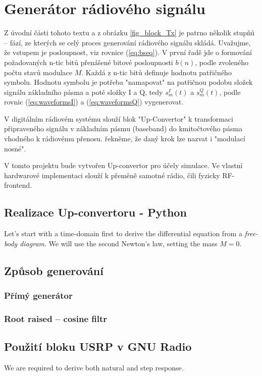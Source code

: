 \section{Generátor rádiového signálu}

Z úvodní části tohoto textu a z obrázku \ref{fig_block_Tx} je patrno několik stupňů -- fází, ze kterých se celý proces generování rádiového signálu skládá. Uvažujme, že vstupem je posloupnost, viz rovnice (\ref{eq:bseq}). V první řadě jde o formování požadovaných n-tic bitů přenášené bitové posloupnosti $b(n)$, podle zvoleného počtu stavů modulace $M$. Každá z n-tic bitů definuje hodnotu patřičného symbolu. Hodnotu symbolu je potřeba "namapovat" na patřičnou podobu složek signálu základního pásma a poté složky I a Q, tedy $s_m^I(t)$ a $s_m^Q(t)$, podle rovnic (\ref{eq:waveformsI}) a (\ref{eq:waveformsQ}) vygenerovat.



\marginpar{\textcolor{txt_blue}{up-convertor}} 
V digitálním rádiovém systému slouží blok "Up-Convertor" k transformaci připraveného signálu v základním pásmu (baseband) do kmitočtového pásma vhodného k rádiovému přenosu. řekněme, že daný krok lze nazvat i "modulací nosné".

V tomto projektu bude vytvořen Up-convertor pro účely simulace. Ve vlastní hardwarové implementaci slouží k přeměně samotné rádio, čili fyzicky RF-frontend.


\subsection{Realizace Up-convertoru - Python}
\marginpar{\textcolor{txt_blue}{Rozbor}} 
Let's start with a time-domain first to derive the differential equation from a \textsl{free-body diagram}. We will use the second Newton's law, setting the mass $M=0$.


\subsection{Způsob generování}

\subsubsection {Přímý generátor}

\subsubsection {Root raised -- cosine filtr}


\subsection{Použití bloku USRP v GNU Radio}
We are required to derive both natural and step response.



